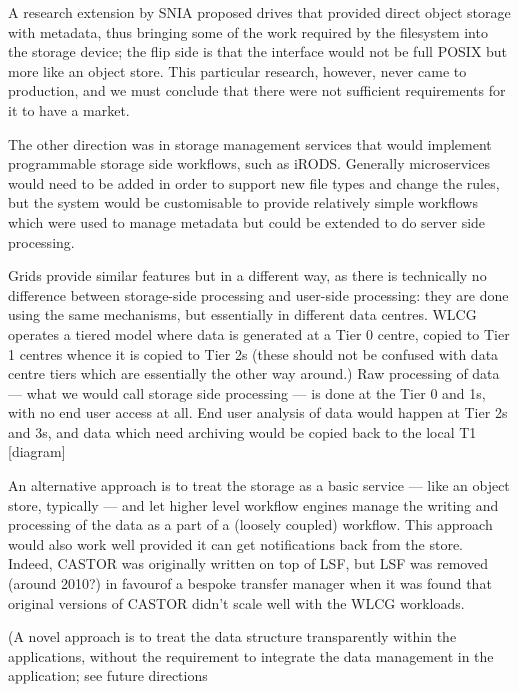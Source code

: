 
A research extension by SNIA proposed drives that provided direct object storage with metadata, thus bringing some of
the work required by the filesystem into the storage device; the flip side is that the interface would not be full POSIX
but more like an object store.  This particular research, however, never came to production, and we must conclude that
there were not sufficient requirements for it to have a market.

The other direction was in storage management services that would implement programmable storage side workflows, such as
iRODS.  Generally microservices would need to be added in order to support new file types and change the rules, but the
system would be customisable to provide relatively simple workflows which were used to manage metadata but could be
extended to do server side processing.

Grids provide similar features but in a different way, as there is technically no difference between storage-side
processing and user-side processing: they are done using the same mechanisms, but essentially in different data
centres. WLCG operates a tiered model where data is generated at a Tier 0 centre, copied to Tier 1 centres whence it is
copied to Tier 2s (these should not be confused with data centre tiers which are essentially the other way around.)  Raw
processing of data ---  what we would call storage side processing --- is done at the Tier 0 and 1s, with no end user access
at all. End user analysis of data would happen at Tier 2s and 3s, and data which need archiving would be copied back to
the local T1 [diagram]

An alternative approach is to treat the storage as a basic service --- like an
object store, typically --- and let higher level workflow engines manage the
writing and processing of the data as a part of a (loosely coupled) workflow.
This approach would also work well provided it can get notifications back from
the store.  Indeed, CASTOR was originally written on top of LSF, but LSF was
removed (around 2010?) in favourof a bespoke transfer manager when it was found
that original versions of CASTOR didn't scale well with the WLCG
workloads.

(A novel approach is to treat the data structure transparently within the applications, without the requirement to
integrate the data management in the application; see future directions


